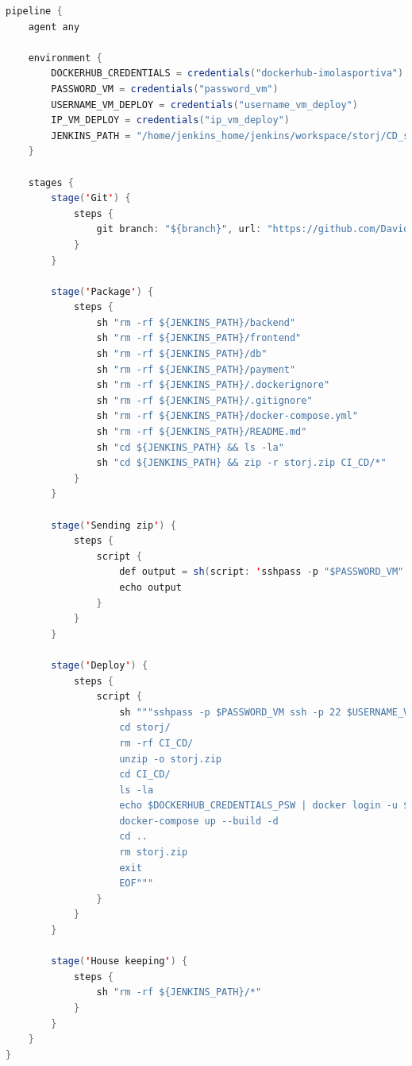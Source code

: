 \documentclass{article}
\begin{document}
\begin{lstlisting}[language = JAVA]
pipeline {
    agent any
    
    environment {
        DOCKERHUB_CREDENTIALS = credentials("dockerhub-imolasportiva")
        PASSWORD_VM = credentials("password_vm")
        USERNAME_VM_DEPLOY = credentials("username_vm_deploy")
        IP_VM_DEPLOY = credentials("ip_vm_deploy")
        JENKINS_PATH = "/home/jenkins_home/jenkins/workspace/storj/CD_storj"
    }
    
    stages {
        stage('Git') {
            steps {
                git branch: "${branch}", url: "https://github.com/DavideDeRosa/storj_SWE"
            }
        }
        
        stage('Package') {
            steps {
                sh "rm -rf ${JENKINS_PATH}/backend"
                sh "rm -rf ${JENKINS_PATH}/frontend"
                sh "rm -rf ${JENKINS_PATH}/db"
                sh "rm -rf ${JENKINS_PATH}/payment"
                sh "rm -rf ${JENKINS_PATH}/.dockerignore"
                sh "rm -rf ${JENKINS_PATH}/.gitignore"
                sh "rm -rf ${JENKINS_PATH}/docker-compose.yml"
                sh "rm -rf ${JENKINS_PATH}/README.md"
                sh "cd ${JENKINS_PATH} && ls -la"
                sh "cd ${JENKINS_PATH} && zip -r storj.zip CI_CD/*"
            }
        }
        
        stage('Sending zip') { 
            steps { 
                script { 
                    def output = sh(script: 'sshpass -p "$PASSWORD_VM" scp ${JENKINS_PATH}/storj.zip $USERNAME_VM_DEPLOY@$IP_VM_DEPLOY:storj/', returnStdout: true) 
                    echo output
                } 
            } 
        }
        
        stage('Deploy') {
            steps {
                script {
                    sh """sshpass -p $PASSWORD_VM ssh -p 22 $USERNAME_VM_DEPLOY@$IP_VM_DEPLOY << EOF 
                    cd storj/
                    rm -rf CI_CD/
                    unzip -o storj.zip
                    cd CI_CD/
                    ls -la
                    echo $DOCKERHUB_CREDENTIALS_PSW | docker login -u $DOCKERHUB_CREDENTIALS_USR --password-stdin
                    docker-compose up --build -d
                    cd ..
                    rm storj.zip
                    exit
                    EOF"""
                }
            }
        }
        
        stage('House keeping') {
            steps {
                sh "rm -rf ${JENKINS_PATH}/*"
            }
        }
    }
}
\end{lstlisting}
\end{document}
